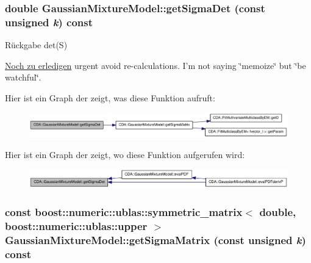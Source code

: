 \hypertarget{classCDA_1_1GaussianMixtureModel_a65065aeca55fef7931c83911ca656a3b}{
\subsubsection[{getSigmaDet}]{\setlength{\rightskip}{0pt plus 5cm}double GaussianMixtureModel::getSigmaDet (const unsigned {\em k}) const}}
\label{classCDA_1_1GaussianMixtureModel_a65065aeca55fef7931c83911ca656a3b}
\begin{DoxyReturn}{Rückgabe}
det(S)
\end{DoxyReturn}
\begin{Desc}
\item[\hyperlink{todo__todo000006}{Noch zu erledigen}]urgent avoid re-\/calculations. I'm not saying \char`\"{}memoize\char`\"{} but \char`\"{}be watchful\char`\"{}. \end{Desc}


Hier ist ein Graph der zeigt, was diese Funktion aufruft:\nopagebreak
\begin{figure}[H]
\begin{center}
\leavevmode
\includegraphics[width=382pt]{classCDA_1_1GaussianMixtureModel_a65065aeca55fef7931c83911ca656a3b_cgraph}
\end{center}
\end{figure}




Hier ist ein Graph der zeigt, wo diese Funktion aufgerufen wird:\nopagebreak
\begin{figure}[H]
\begin{center}
\leavevmode
\includegraphics[width=360pt]{classCDA_1_1GaussianMixtureModel_a65065aeca55fef7931c83911ca656a3b_icgraph}
\end{center}
\end{figure}


\hypertarget{classCDA_1_1GaussianMixtureModel_a0950a8909e82521c0919f337d18dbe04}{
\subsubsection[{getSigmaMatrix}]{\setlength{\rightskip}{0pt plus 5cm}const boost::numeric::ublas::symmetric\_\-matrix$<$ double, boost::numeric::ublas::upper $>$ GaussianMixtureModel::getSigmaMatrix (const unsigned {\em k}) const}}
\label{classCDA_1_1GaussianMixtureModel_a0950a8909e82521c0919f337d18dbe04}


